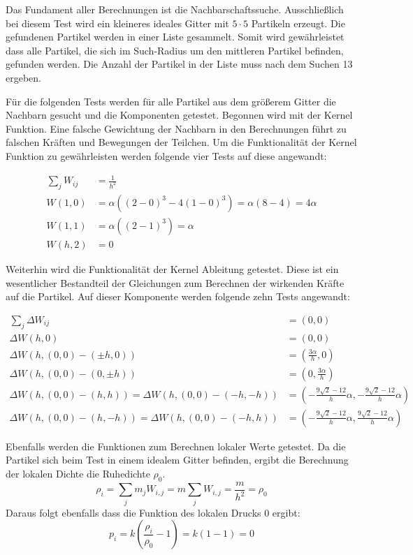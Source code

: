 \documentclass[a4paper, 12pt]{article}
\begin{document}
Das Fundament aller Berechnungen ist die Nachbarschaftssuche. Ausschließlich bei diesem Test wird ein kleineres ideales Gitter mit $5 \cdot 5$ Partikeln erzeugt.
Die gefundenen Partikel werden in einer Liste gesammelt. Somit wird gewährleistet dass alle Partikel, die sich im Such-Radius um den mittleren Partikel befinden, gefunden werden. Die Anzahl der Partikel in der Liste muss nach dem Suchen 13 ergeben.

Für die folgenden Tests werden für alle Partikel aus dem größerem Gitter die Nachbarn gesucht und die Komponenten getestet. 
Begonnen wird mit der Kernel Funktion. Eine falsche Gewichtung der Nachbarn in den Berechnungen führt zu falschen Kräften und Bewegungen der Teilchen. Um die Funktionalität der Kernel Funktion zu gewährleisten werden folgende vier Tests \cite{huang2024journey} auf diese angewandt:

\begin{align*}
	\sum_{j} W_{ij} &= \frac{1}{h^2}\\
	W(1, 0) &= \alpha ((2-0)^3 - 4(1-0)^3) = \alpha (8 - 4) = 4\alpha\\
	W(1, 1) &= \alpha ((2-1)^3) = \alpha\\
	W(h, 2) &= 0
\end{align*}

Weiterhin wird die Funktionalität der Kernel Ableitung getestet. Diese ist ein wesentlicher Bestandteil der Gleichungen zum Berechnen der wirkenden Kräfte auf die Partikel. Auf dieser Komponente werden folgende zehn Tests \cite{huang2024journey} angewandt:

\begin{align*}
	\sum_{j} \Delta W_{ij} &= (0, 0)\\
	\Delta W(h, 0) &= (0, 0)\\
	\Delta W(h, (0, 0) - (\pm h, 0)) &= (\frac{3\alpha}{h}, 0)\\
	\Delta W(h, (0, 0) - (0, \pm h)) &= (0, \frac{3\alpha}{h})\\
	\Delta W(h, (0, 0) - (h, h)) = \Delta W(h, (0, 0) - (- h, - h))&= (-\frac{9\sqrt{2} - 12}{h} \alpha,-\frac{9\sqrt{2} - 12}{h} \alpha)\\
	\Delta W(h, (0, 0) - (h, -h)) = \Delta W(h, (0, 0) - (-h, h)) &= (-\frac{9\sqrt{2} - 12}{h} \alpha,\frac{9\sqrt{2} - 12}{h} \alpha)
\end{align*}

Ebenfalls werden die Funktionen zum Berechnen lokaler Werte getestet. Da die Partikel sich beim Test in einem idealem Gitter befinden, ergibt die Berechnung der lokalen Dichte die Ruhedichte $\rho_0$.
\[\rho_i = \sum_{j} m_j W_{i, j} = m \sum_{j} W_{i, j} = \frac{m}{h^2} = \rho_0\]
Daraus folgt ebenfalls dass die Funktion des lokalen Drucks 0 ergibt:
\[p_i = k(\frac{\rho_i}{\rho_0} - 1) = k(1 - 1) = 0\]
\end{document}
